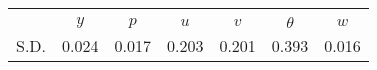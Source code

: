 \begin{tabular}{l*{1}{cccccc}}
\toprule
                &\multicolumn{6}{c}{}                                       \\
                &  $  y $&  $  p$&$ u $&$ v $&$ \theta $&$ w $\\
\midrule
S.D.              &    0.024&    0.017&    0.203&    0.201&    0.393&    0.016\\
\bottomrule
\end{tabular}
